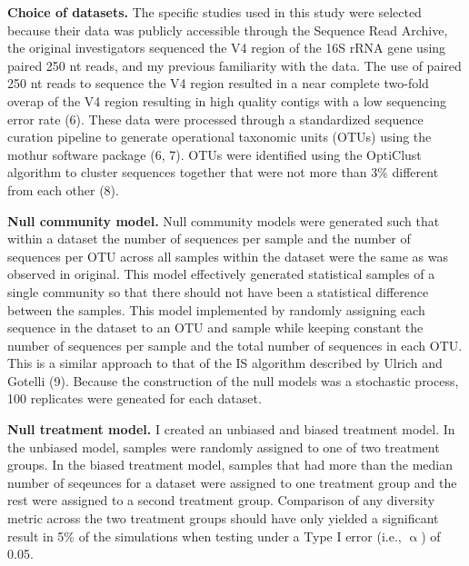 \documentclass[
]{article}
\begin{document}
\textbf{Choice of datasets.} The specific studies used in this study
were selected because their data was publicly accessible through the
Sequence Read Archive, the original investigators sequenced the V4
region of the 16S rRNA gene using paired 250 nt reads, and my previous
familiarity with the data. The use of paired 250 nt reads to sequence
the V4 region resulted in a near complete two-fold overap of the V4
region resulting in high quality contigs with a low sequencing error
rate (6). These data were processed through a standardized sequence
curation pipeline to generate operational taxonomic units (OTUs) using
the mothur software package (6, 7). OTUs were identified using the
OptiClust algorithm to cluster sequences together that were not more
than 3\% different from each other (8).

\textbf{Null community model.} Null community models were generated such
that within a dataset the number of sequences per sample and the number
of sequences per OTU across all samples within the dataset were the same
as was observed in original. This model effectively generated
statistical samples of a single community so that there should not have
been a statistical difference between the samples. This model
implemented by randomly assigning each sequence in the dataset to an OTU
and sample while keeping constant the number of sequences per sample and
the total number of sequences in each OTU. This is a similar approach to
that of the IS algorithm described by Ulrich and Gotelli (9). Because
the construction of the null models was a stochastic process, 100
replicates were geneated for each dataset.

\textbf{Null treatment model.} I created an unbiased and biased
treatment model. In the unbiased model, samples were randomly assigned
to one of two treatment groups. In the biased treatment model, samples
that had more than the median number of seqeunces for a dataset were
assigned to one treatment group and the rest were assigned to a second
treatment group. Comparison of any diversity metric across the two
treatment groups should have only yielded a significant result in 5\% of
the simulations when testing under a Type I error (i.e., \(\upalpha\))
of 0.05.
\end{document}
